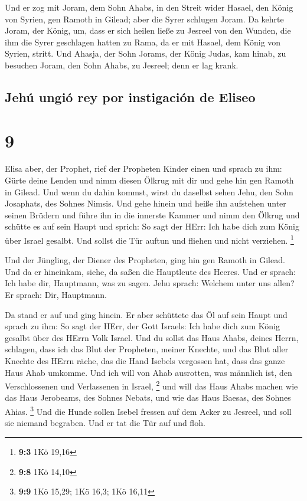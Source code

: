  Und er zog mit Joram, dem Sohn Ahabs, in den Streit
wider Hasael, den König von Syrien, gen Ramoth in Gilead; aber die Syrer
schlugen Joram.  Da kehrte Joram, der König, um, dass er
sich heilen ließe zu Jesreel von den Wunden, die ihm die Syrer
geschlagen hatten zu Rama, da er mit Hasael, dem König von Syrien,
stritt. Und Ahasja, der Sohn Jorams, der König Judas, kam hinab, zu
besuchen Joram, den Sohn Ahabs, zu Jesreel; denn er lag krank.

\hypertarget{jehuxfa-ungiuxf3-rey-por-instigaciuxf3n-de-eliseo}{%
\subsection{Jehú ungió rey por instigación de
Eliseo}\label{jehuxfa-ungiuxf3-rey-por-instigaciuxf3n-de-eliseo}}

\hypertarget{section-8}{%
\section{9}\label{section-8}}

 Elisa aber, der Prophet, rief der Propheten Kinder einen
und sprach zu ihm: Gürte deine Lenden und nimm diesen Ölkrug mit dir und
gehe hin gen Ramoth in Gilead.  Und wenn du dahin kommst,
wirst du daselbst sehen Jehu, den Sohn Josaphats, des Sohnes Nimsis. Und
gehe hinein und heiße ihn aufstehen unter seinen Brüdern und führe ihn
in die innerste Kammer  und nimm den Ölkrug und schütte es
auf sein Haupt und sprich: So sagt der HErr: Ich habe dich zum König
über Israel gesalbt. Und sollst die Tür auftun und fliehen und nicht
verziehen. \footnote{\textbf{9:3} 1Kö 19,16}

 Und der Jüngling, der Diener des Propheten, ging hin gen
Ramoth in Gilead.  Und da er hineinkam, siehe, da saßen
die Hauptleute des Heeres. Und er sprach: Ich habe dir, Hauptmann, was
zu sagen. Jehu sprach: Welchem unter uns allen? Er sprach: Dir,
Hauptmann.

 Da stand er auf und ging hinein. Er aber schüttete das Öl
auf sein Haupt und sprach zu ihm: So sagt der HErr, der Gott Israels:
Ich habe dich zum König gesalbt über des HErrn Volk Israel.
 Und du sollst das Haus Ahabs, deines Herrn, schlagen,
dass ich das Blut der Propheten, meiner Knechte, und das Blut aller
Knechte des HErrn räche, das die Hand Isebels vergossen hat,
 dass das ganze Haus Ahab umkomme. Und ich will von Ahab
ausrotten, was männlich ist, den Verschlossenen und Verlassenen in
Israel, \footnote{\textbf{9:8} 1Kö 14,10}  und will das
Haus Ahabs machen wie das Haus Jerobeams, des Sohnes Nebats, und wie das
Haus Baesas, des Sohnes Ahias. \footnote{\textbf{9:9} 1Kö 15,29; 1Kö
  16,3; 1Kö 16,11}  Und die Hunde sollen Isebel fressen
auf dem Acker zu Jesreel, und soll sie niemand begraben. Und er tat die
Tür auf und floh.

